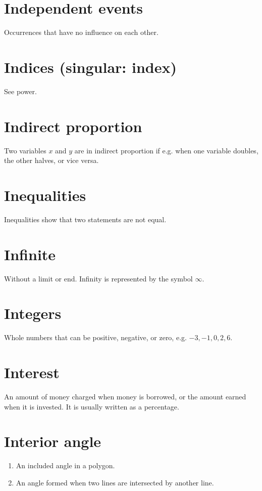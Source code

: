 \documentclass[10pt]{article}
\begin{document}
\section*{Independent events}
Occurrences that have no influence on each other.

\section*{Indices (singular: index)}
See power.

\section*{Indirect proportion}
Two variables $x$ and $y$ are in indirect proportion if e.g. when one variable doubles, the other halves, or vice versa.

\section*{Inequalities}
Inequalities show that two statements are not equal.

\section*{Infinite}
Without a limit or end. Infinity is represented by the symbol $\infty$.

\section*{Integers}
Whole numbers that can be positive, negative, or zero, e.g. $-3,-1,0,2,6$.

\section*{Interest}
An amount of money charged when money is borrowed, or the amount earned when it is invested. It is usually written as a percentage.

\section*{Interior angle}
\begin{enumerate}
  \item An included angle in a polygon.
  \item An angle formed when two lines are intersected by another line.
\end{enumerate}
\end{document}
